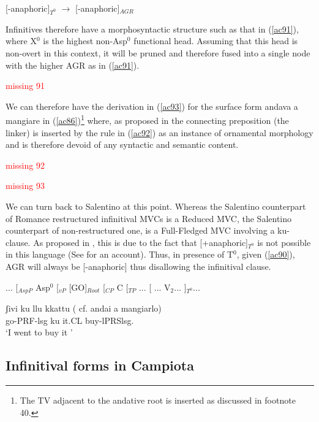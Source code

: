 \documentclass[output=paper]{langscibook}
\begin{document}
\ea \label{ac90} {[}-anaphoric{]}$_{T^0}$ $\rightarrow$ [-anaphoric]$_{AGR}$
\z

Infinitives therefore have a morphosyntactic structure such as that in (\ref{ac91}), where X$^0$ is the highest non-Asp$^0$ functional head.  Assuming that this head is non-overt in this context, it will be pruned and therefore fused into a single node with the higher AGR as  in (\ref{ac91}). 

\ea\label{ac91}
\textcolor{red}{missing 91}
\z

We can therefore have the derivation in (\ref{ac93}) for the surface form andava a mangiare in (\ref{ac86})\footnote{The TV adjacent to the andative root is inserted as discussed in footnote 40.} where, as proposed in \cite{cruschina2021a} the connecting preposition (the linker) is inserted by the rule in (\ref{ac92}) as an instance of ornamental morphology and is therefore devoid of any syntactic and semantic content. 

\ea \label{ac92}
\textcolor{red}{missing 92}
\z

\ea\label{ac93}
\textcolor{red}{missing 93}
\z

We can turn back to Salentino at this point. Whereas the Salentino counterpart of Romance restructured infinitival MVCs is a Reduced MVC, the Salentino counterpart of non-restructured one, is a Full-Fledged MVC involving a ku-clause.  As proposed in \cite{calabrese1993a}, this is due to the fact that [+anaphoric]$_{T^0}$ is not possible in this language (See \cite{calabrese1993a} for an account).  Thus, in presence of T$^0$, given (\ref{ac90}), AGR will always be [-anaphoric] thus disallowing the infinitival clause.

\ea\label{ac94}
 ... [$_{AspP}$ Asp$^0$ [$_{vP}$ [GO]$_{Root}$ [$_{CP}$ C [$_{TP}$ ... [ ... V$_2$... ]$_{T^0}$...
\z

\ea \label{ac95} \gll  ʃivi  ku  llu kkattu ( cf. andai a mangiarlo)\\
  go-PRF-lsg  ku  it.CL buy-lPRSlsg. \\
 \glt ‘I went to buy it '
\z

\subsection{Infinitival forms in Campiota}
\end{document}
